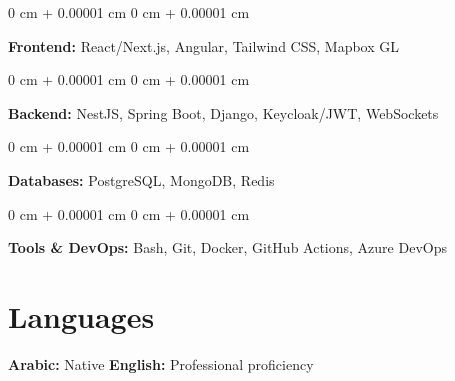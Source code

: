 \documentclass[7pt, letterpaper]{extarticle}
\newenvironment{onecolentry}{
    \begin{adjustwidth}{
        0 cm + 0.00001 cm
    }{
        0 cm + 0.00001 cm
    }
}{
    \end{adjustwidth}
} %
\begin{document}
        \begin{onecolentry}
            \textbf{Frontend:} React/Next.js, Angular, Tailwind CSS, Mapbox GL
        \end{onecolentry}
        \vspace{0.10 cm}
        
        \begin{onecolentry}
            \textbf{Backend:} NestJS, Spring Boot, Django, Keycloak/JWT, WebSockets
        \end{onecolentry}
        \vspace{0.10 cm}
        
        \begin{onecolentry}
            \textbf{Databases:} PostgreSQL, MongoDB, Redis
        \end{onecolentry}
        \vspace{0.10 cm}
        
        \begin{onecolentry}
            \textbf{Tools \& DevOps:} Bash, Git, Docker, GitHub Actions, Azure DevOps
        \end{onecolentry}
        \vspace{0.10 cm}

    \section{Languages}
        \textbf{Arabic:} Native
        \hspace{1 cm}
        \textbf{English:} Professional proficiency
\end{document}
